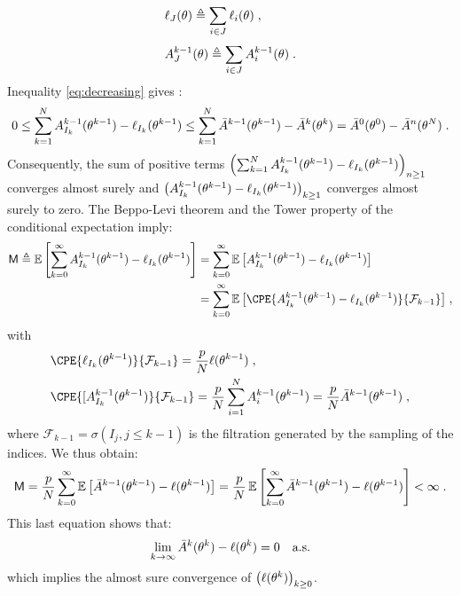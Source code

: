 \begin{align}\label{batchnotation}
& \ell_{J}(\theta) \triangleq \sum_{i \in J}^{}{\ell_{i}(\theta)}\;,\\
& A^{k-1}_{J}(\theta) \triangleq \sum_{i \in J}^{}{A^{k-1}_{i}(\theta)}\;.
\end{align}
Inequality \eqref{eq:decreasing} gives :
\begin{align}
0 \leq \sum_{k=1}^{N}{A^{k-1}_{I_{k}}(\theta^{k-1}) - \ell_{I_{k}}(\theta^{k-1})} \leq \sum_{k=1}^{N}{ \bar{A}^{k-1}(\theta^{k-1}) - \bar{A}^k(\theta^{k})} =  \bar{A}^{0}(\theta^{0}) - \bar{A}^n(\theta^{N})\;.
\end{align}
Consequently, the sum of positive terms $\left(\sum_{k=1}^{N}{A^{k-1}_{I_{k}}(\theta^{k-1}) - \ell_{I_{k}}(\theta^{k-1})} \right)_{n \geq 1}$ converges almost surely and $\left(A^{k-1}_{I_{k}}(\theta^{k-1}) - \ell_{I_{k}}(\theta^{k-1})\right)_{k\geq1}$ converges almost surely to zero.
The Beppo-Levi theorem and the Tower property of the conditional expectation imply:
\begin{align}\label{Mdeter1}
\mathsf{M} \triangleq \E \left[\sum_{k=0}^{\infty}{A^{k-1}_{I_{k}}(\theta^{k-1}) - \loglike_{I_{k}}(\theta^{k-1})}\right] & = \sum_{k=0}^{\infty}{\E \left[A^{k-1}_{I_{k}}(\theta^{k-1}) - \loglike_{I_{k}}(\theta^{k-1})\right]} \\
& = \sum_{k=0}^{\infty}{\E \left[\CPE{A^{k-1}_{I_{k}}(\theta^{k-1}) - \loglike_{I_{k}}(\theta^{k-1})}{\mathcal{F}_{k-1}} \right]}\eqs,
\end{align}
with 
\begin{align*}
& \CPE{\loglike_{I_{k}}(\theta^{k-1})}{\mathcal{F}_{k-1}} = \frac{p}{N} \loglike(\theta^{k-1}) \eqs,\\
& \CPE{[A^{k-1}_{I_{k}}(\theta^{k-1})}{\mathcal{F}_{k-1}} = \frac{p}{N} \sum_{i=1}^{N}{A^{k-1}_{i}(\theta^{k-1})} = \frac{p}{N}\bar{A}^{k-1}(\theta^{k-1}) \eqs,
\end{align*}
where $\mathcal{F}_{k-1} = \sigma(I_j, j \leq k-1)$ is the filtration generated by the sampling of the indices.
We thus obtain:
\begin{align}\label{Mdeter2}
\mathsf{M} =\frac{p}{N} \sum_{k=0}^{\infty}{\operatorname*{\mathbb{E}} \left[\bar{A}^{k-1}(\theta^{k-1}) - \ell(\theta^{k-1})\right]} = \frac{p}{N} \operatorname*{\mathbb{E}} \left[\sum_{k=0}^{\infty}{\bar{A}^{k-1}(\theta^{k-1}) - \ell(\theta^{k-1})}\right] < \infty \;.
\end{align}
This last equation shows that:
\begin{equation}\label{detergap}
    \lim \limits_{k \to \infty} \bar{A}^{k}(\theta^{k}) - \ell(\theta^{k}) = 0 \quad \textrm{a.s.}
\end{equation}
which implies the almost sure convergence of $\left(\ell(\theta^{k})\right)_{k\geq0}$.

